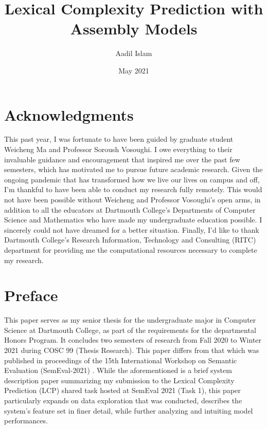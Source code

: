 \documentclass{dcthesis}
\title{Lexical Complexity Prediction with Assembly Models}
\author{Aadil Islam}
\date{May 2021}
\theoremstyle{definition}
\theoremstyle{remark}
\begin{document}
\frontmatter

\maketitle
\restoregeometry

\chapter*{Acknowledgments}
This past year, I was fortunate to have been guided by graduate student Weicheng Ma and Professor Soroush Vosoughi. I owe everything to their invaluable guidance and encouragement that inspired me over the past few semesters, which has motivated me to pursue future academic research. Given the ongoing pandemic that has transformed how we live our lives on campus and off, I'm thankful to have been able to conduct my research fully remotely. This would not have been possible without Weicheng and Professor Vosoughi's open arms, in addition to all the educators at Dartmouth College's Departments of Computer Science and Mathematics who have made my undergraduate education possible. I sincerely could not have dreamed for a better situation. Finally, I'd like to thank Dartmouth College's Research Information, Technology and Consulting (RITC) department for providing me the computational resources necessary to complete my research. 

\chapter*{Preface}
This paper serves as my senior thesis for the undergraduate major in Computer Science at Dartmouth College, as part of the requirements for the departmental Honors Program. It concludes two semesters of research from Fall 2020 to Winter 2021 during COSC 99 (Thesis Research). This paper differs from that which was published in proceedings of the 15th International Workshop on Semantic Evaluation (SemEval-2021) \citep{islam2021biggreen}. While the aforementioned is a brief system description paper summarizing my submission to the Lexical Complexity Prediction (LCP) shared task hosted at SemEval 2021 (Task 1), this paper particularly expands on data exploration that was conducted, describes the system's feature set in finer detail, while further analyzing and intuiting model performances. 
\end{document}
